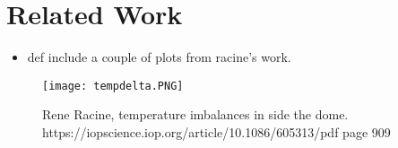 \section{Related Work}\label{sec:relatedWork}
\begin{itemize}
    \item def include a couple of plots from racine's work.
\end{itemize}

\iffalse
\begin{figure*}
    \texttt{[image: Cfht Observatory 1-compressed.pdf]}
    \label{fig:subim1}
\end{figure*}


\begin{figure*}
    \centering
    \texttt{[image: iqcontributions.PNG]}
    \caption{https://iopscience.iop.org/article/10.1086/605313/pdf page 919}
    \label{fig:my_label}
\end{figure*}
\fi


\begin{figure*}
    \centering
    \texttt{[image: tempdelta.PNG]}
    \caption{Rene Racine, temperature imbalances in side the dome. https://iopscience.iop.org/article/10.1086/605313/pdf page 909}
    \label{fig:my_label}
\end{figure*}
